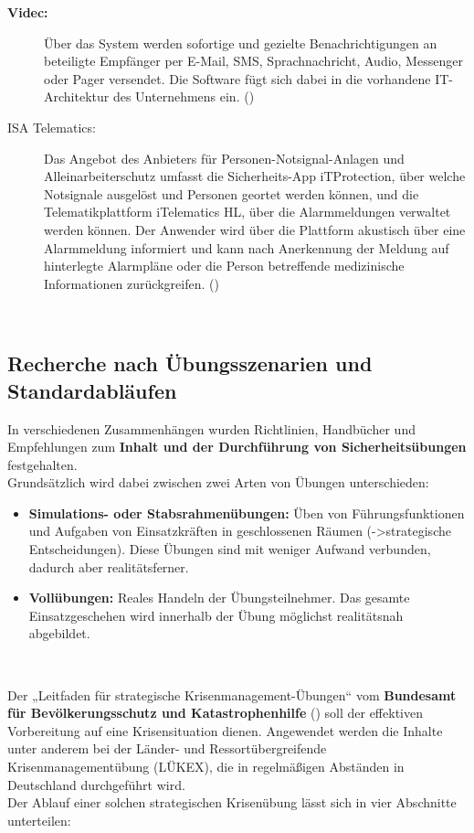 \begin{description}
   \item [\textbf{Videc:}] Über das System werden sofortige und gezielte Benachrichtigungen an beteiligte Empfänger per E-Mail, SMS, Sprachnachricht, Audio, Messenger oder Pager versendet. Die Software fügt sich dabei in die vorhandene IT-Architektur des Unternehmens ein. (\cite{VIDEC})

   \item[ISA Telematics:] Das Angebot des Anbieters für Personen-Notsignal-Anlagen und Alleinarbeiterschutz umfasst die Sicherheits-App iTProtection, über welche Notsignale ausgelöst und Personen geortet werden können, und  die Telematikplattform iTelematics HL, über die Alarmmeldungen verwaltet werden können. Der Anwender wird über die Plattform akustisch über eine Alarmmeldung informiert und kann nach Anerkennung der Meldung auf hinterlegte Alarmpläne oder die Person betreffende medizinische Informationen zurückgreifen. (\cite{ISA_Telematics})

\end{description} \ 

\newpage
\subsection{Recherche nach Übungsszenarien und Standardabläufen}

In verschiedenen Zusammenhängen wurden Richtlinien, Handbücher und Empfehlungen zum \textbf{Inhalt und der Durchführung von Sicherheitsübungen} festgehalten. \\
Grundsätzlich wird dabei zwischen zwei Arten von Übungen unterschieden:
\begin{itemize}
    \item \textbf{Simulations- oder Stabsrahmenübungen: } Üben von Führungsfunktionen und Aufgaben von Einsatzkräften in geschlossenen Räumen (->strategische Entscheidungen). Diese Übungen sind mit weniger Aufwand verbunden, dadurch aber realitätsferner.   
    \item \textbf{Vollübungen: }Reales Handeln der Übungsteilnehmer. Das gesamte Einsatzgeschehen wird innerhalb der Übung möglichst realitätsnah abgebildet.
\end{itemize}\ 


Der „Leitfaden für strategische Krisenmanagement-Übungen“ vom \textbf{Bundesamt für Bevölkerungsschutz und Katastrophenhilfe} (\cite{strat_KrisenMGMT}) soll der effektiven Vorbereitung auf eine Krisensituation dienen. Angewendet werden die Inhalte unter anderem bei der Länder- und Ressortübergreifende Krisenmanagementübung (LÜKEX), die in regelmäßigen Abständen in Deutschland durchgeführt wird. \\
Der Ablauf einer solchen strategischen Krisenübung lässt sich in vier Abschnitte unterteilen:

